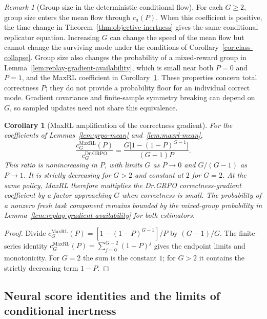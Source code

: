 \documentclass{article}
\newcommand{\enforcehalffinalproseline}{%
  \setlength{\parfillskip}{0pt plus .20\linewidth}}
\newcommand{\1}{\mathbf 1}
\newtheorem{corollary}[lemma]{Corollary}
\theoremstyle{remark}
\newtheorem{remark}[lemma]{Remark}
\theoremstyle{definition}
\theoremstyle{plain}
\begin{document}
\begin{remark}[Group size in the deterministic conditional flow]
\label{rem:group-size-inert}
For each $G\ge2$, group size enters the mean flow through $c_a(P)$.
When this coefficient is positive, the time change in
Theorem~\ref{thm:objective-inertness} gives the same conditional replicator
equation. Increasing $G$ can change the speed of the mean flow but cannot
change the surviving mode under the conditions of
Corollary~\ref{cor:class-collapse}.
Group size also changes the probability of a mixed-reward group in
Lemma~\ref{lem:replay-gradient-availability}, which is small near both
$P=0$ and $P=1$, and the MaxRL coefficient in
Corollary~\ref{cor:maxrl-starvation}. These properties concern total
correctness $P$; they do not provide a probability floor for an individual
correct mode. Gradient covariance and finite-sample symmetry breaking can depend on $G$,
so sampled updates need not share this equivalence.
\end{remark}

\begin{corollary}[MaxRL amplification of the correctness gradient]
\enforcehalffinalproseline
\label{cor:maxrl-starvation}
For the coefficients of Lemmas~\ref{lem:grpo-mean} and~\ref{lem:maxrl-mean},
\[
 \frac{c_G^{\mathrm{MaxRL}}(P)}{c_G^{\mathrm{Dr.GRPO}}}
 =\frac{G\big[1-(1-P)^{G-1}\big]}{(G-1)P}.
\]
This ratio is nonincreasing in $P$, with limits $G$ as $P\to0$ and
$G/(G-1)$ as $P\to1$. It is strictly decreasing for $G>2$ and constant
at $2$ for $G=2$. At the same policy, MaxRL therefore multiplies the
Dr.GRPO correctness-gradient coefficient by a factor approaching $G$ when
correctness is small. The probability of a nonzero fresh task component
remains bounded by the mixed-group probability in
Lemma~\ref{lem:replay-gradient-availability} for both estimators.
\end{corollary}

\begin{proof}
\enforcehalffinalproseline
Divide $c_G^{\mathrm{MaxRL}}(P)=[1-(1-P)^{G-1}]/P$ by $(G-1)/G$.
The finite-series identity
$c_G^{\mathrm{MaxRL}}(P)=\sum_{j=0}^{G-2}(1-P)^j$
gives the endpoint limits and monotonicity. For $G=2$ the sum is the
constant $1$; for $G>2$ it contains the strictly decreasing term $1-P$.
\end{proof}

\subsection{Neural score identities and the limits of conditional inertness}
\label{app:neural-binary-inertness}
\end{document}

